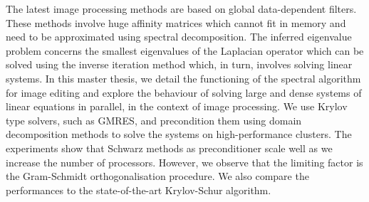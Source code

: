 The latest image processing methods are based on global data-dependent filters.
These methods involve huge affinity matrices which cannot fit in memory and need to be approximated using spectral decomposition.
The inferred eigenvalue problem concerns the smallest eigenvalues of the Laplacian operator which can be solved using the inverse iteration method which, in turn, involves solving linear systems.
In this master thesis, we detail the functioning of the spectral algorithm for image editing and explore the behaviour of solving large and dense systems of linear equations in parallel, in the context of image processing.
We use Krylov type solvers, such as GMRES, and precondition them using domain decomposition methods to solve the systems on high-performance clusters.
The experiments show that Schwarz methods as preconditioner scale well as we increase the number of processors.
However, we observe that the limiting factor is the Gram-Schmidt orthogonalisation procedure.
We also compare the performances to the state-of-the-art Krylov-Schur algorithm.
